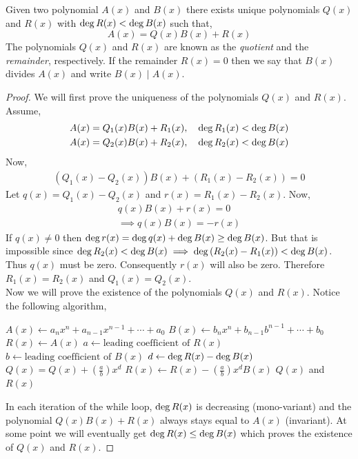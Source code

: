 \begin{theorem}\label{thm:division-algorithm}
    Given two polynomial $A(x)$ and $B(x)$ there exists unique polynomials $Q(x)$ and $R(x)$ with $\operatorname{deg} R(x) < \operatorname{deg} B(x)$ 
    such that,
    \[
        A(x) = Q(x)B(x) + R(x)
    \]
    The polynomials $Q(x)$ and $R(x)$ are known as the \textit{quotient} and the \textit{remainder}, respectively. If the 
    remainder $R(x)=0$ then we say that $B(x)$ divides $A(x)$ and write $B(x) \mid A(x)$.
\end{theorem}
\begin{proof}
    We will first prove the uniqueness of the polynomials $Q(x)$ and $R(x)$. Assume,
    \begin{align*}
        & A(x) = Q_{1}(x)B(x) + R_{1}(x), \quad \operatorname{deg} R_{1}(x) < \operatorname{deg} B(x) \\
        & A(x) = Q_{2}(x)B(x) + R_{2}(x), \quad \operatorname{deg} R_{2}(x) < \operatorname{deg} B(x)
    \end{align*}
    Now,
    \begin{align*}
                 \left(Q_{1}(x) - Q_{2}(x)\right)B(x) + \left(R_{1}(x) - R_{2}(x)\right) = 0
    \end{align*}
    Let $q(x) = Q_{1}(x) - Q_{2}(x)$ and $r(x) = R_{1}(x) - R_{2}(x)$. Now,
    \begin{align*}
                 q(x)B(x) + r(x) = 0 \\
        \implies q(x)B(x) = -r(x)
    \end{align*}
    If $q(x)\neq 0$ then $\operatorname{deg} r(x) = \operatorname{deg} q(x) + \operatorname{deg} B(x) \geq \operatorname{deg} B(x)$. But that is impossible since 
    $\operatorname{deg} R_{2}(x) < \operatorname{deg} B(x) \implies \operatorname{deg} \left(R_{2}(x) - R_{1}(x)\right) < \operatorname{deg} B(x)$. Thus $q(x)$ must be zero. 
    Consequently $r(x)$ will also be zero. Therefore $R_{1}(x)=R_{2}(x)$ and $Q_{1}(x)=Q_{2}(x)$. \\
    Now we will prove the existence of the polynomials $Q(x)$ and $R(x)$. Notice the following algorithm,

    \begin{algorithmic}[1]
        \State $A(x) \gets a_{n}x^{n} + a_{n-1}x^{n-1}+\cdots+a_{0}$
        \State $B(x) \gets b_{n}x^{n} + b_{n-1}b^{n-1}+\cdots+b_{0}$
        \State $R(x) \gets A(x)$
            \State $a \gets \text{leading coefficient of }R(x)$
            \State $b \gets \text{leading coefficient of }B(x)$
            \State $d \gets \operatorname{deg} R(x) - \operatorname{deg} B(x)$
            \State $Q(x) = Q(x) + \left(\frac{a}{b}\right)x^{d}$
            \State $R(x) \gets R(x) - \left(\frac{a}{b}\right)x^{d}B(x)$
        \EndWhile
        \Output $Q(x)$ and $R(x)$
    \end{algorithmic}
    In each iteration of the while loop, $\operatorname{deg} R(x)$ is decreasing (mono-variant) and 
    the polynomial $Q(x)B(x) + R(x)$ always stays equal to $A(x)$ (invariant). 
    At some point we will eventually get $\operatorname{deg} R(x) \leq \operatorname{deg} B(x)$ which proves the existence of $Q(x)$ and $R(x)$.


\end{proof}
